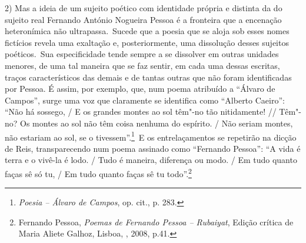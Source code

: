 2) Mas a ideia de um sujeito poético com identidade própria e distinta
da do sujeito real Fernando António Nogueira Pessoa é a fronteira que a
encenação heteronímica não ultrapassa.~Sucede que a poesia que se aloja
sob esses nomes fictícios revela uma exaltação e, posteriormente, uma
dissolução desses sujeitos poéticos.~Sua especificidade tende sempre a
se dissolver em outras unidades menores, de uma tal maneira que se faz
sentir, em cada uma dessas escritas, traços característicos das demais e
de tantas outras que não foram identificadas por Pessoa. É assim, por
exemplo, que, num poema atribuído a ``Álvaro de Campos'', surge uma voz
que claramente se identifica como ``Alberto Caeiro'': ``Não há sossego,
/ E os grandes montes ao sol têm"-no tão nitidamente! // Têm"-no? Os
montes ao sol não têm coisa nenhuma do espírito. / Não seriam montes,
não estariam ao sol, se o tivessem''.\footnote{\emph{Poesia -- Álvaro de
  Campos}, op. cit., p. 283.}~E os entrelaçamentos se repetirão na
dicção de Reis, transparecendo num poema assinado como ``Fernando
Pessoa'': ``A vida é terra e o vivê-la é lodo. / Tudo é maneira,
diferença ou modo. / Em tudo quanto faças sê só tu, / Em tudo quanto
faças sê tu todo''.\footnote{Fernando Pessoa, \emph{Poemas de Fernando
  Pessoa -- Rubaiyat}, Edição crítica de Maria Aliete Galhoz, Lisboa,
  , 2008, p.41.}

